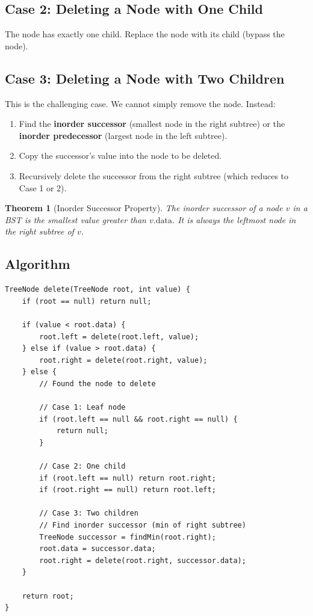 \documentclass[10pt,journal,compsoc,onecolumn]{IEEEtran}
\newtheorem{theorem}{Theorem}
\begin{document}
\subsection{Case 2: Deleting a Node with One Child}

The node has exactly one child. Replace the node with its child (bypass the node).

\subsection{Case 3: Deleting a Node with Two Children}

This is the challenging case. We cannot simply remove the node. Instead:
\begin{enumerate}
    \item Find the \textbf{inorder successor} (smallest node in the right subtree) or the \textbf{inorder predecessor} (largest node in the left subtree).
    \item Copy the successor's value into the node to be deleted.
    \item Recursively delete the successor from the right subtree (which reduces to Case 1 or 2).
\end{enumerate}

\begin{theorem}[Inorder Successor Property]
The inorder successor of a node $v$ in a BST is the smallest value greater than $v.\text{data}$. It is always the leftmost node in the right subtree of $v$.
\end{theorem}

\subsection{Algorithm}

\begin{verbatim}
TreeNode delete(TreeNode root, int value) {
    if (root == null) return null;
    
    if (value < root.data) {
        root.left = delete(root.left, value);
    } else if (value > root.data) {
        root.right = delete(root.right, value);
    } else {
        // Found the node to delete
        
        // Case 1: Leaf node
        if (root.left == null && root.right == null) {
            return null;
        }
        
        // Case 2: One child
        if (root.left == null) return root.right;
        if (root.right == null) return root.left;
        
        // Case 3: Two children
        // Find inorder successor (min of right subtree)
        TreeNode successor = findMin(root.right);
        root.data = successor.data;
        root.right = delete(root.right, successor.data);
    }
    
    return root;
}
\end{verbatim}
\end{document}

